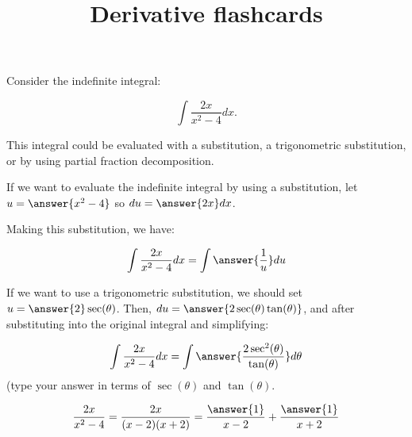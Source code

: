 \documentclass{ximera}
\title{Derivative flashcards}
\begin{document}
\begin{exercise}
Consider the indefinite integral:
 
\[
\int \frac{2x}{x^2-4} dx.
\]
 
This integral could be evaluated with a substitution, a trigonometric substitution, or by using partial fraction decomposition.
 
If we want to evaluate the indefinite integral by using a substitution, let $u= \answer{x^2-4}$ so $du = \answer{2x} dx$.
 
\begin{exercise}
Making this substitution, we have:
 
\[
\int \frac{2x}{x^2-4} dx = \int \answer{\frac{1}{u}} du
\]
\end{exercise}

\begin{exercise}
If we want to use a trigonometric substitution, we should set $u=\answer{2} \sec(\theta)$.  Then, $du = \answer{2 \sec(\theta)\tan(\theta)}$, and after substituting into the original integral and simplifying:
 
\[
\int \frac{2x}{x^2-4} dx = \int \answer{\frac{2 \sec^2(\theta)}{\tan(\theta)}} d\theta
\]
(type your answer in terms of $\sec(\theta)$ and $\tan(\theta)$.
 
\end{exercise}
 
\[
\frac{2x}{x^2-4} = \frac{2x}{(x-2)(x+2)} = \frac{\answer{1}}{x-2}+\frac{\answer{1}}{x+2}
\]
  
\end{exercise}
\end{document}
